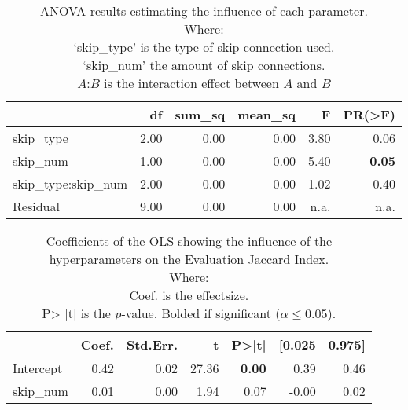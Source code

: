 \begin{table}[ht]
\centering
\caption{ANOVA results estimating the influence of each parameter.\\Where: \\\hphantom{tabb}`skip\_type' is the type of skip connection used.\\\hphantom{tabb}`skip\_num' the amount of skip connections.\\\hphantom{tabb}$A$:$B$ is the interaction effect between $A$ and $B$}
\label{tab:skip_importance_anova_all}
\begin{tabular}{lrrrrr}
\toprule
 & df & sum\_sq & mean\_sq & F & PR(>F) \\
\midrule
skip\_type & 2.00 & 0.00 & 0.00 & 3.80 & 0.06 \\
skip\_num & 1.00 & 0.00 & 0.00 & 5.40 & \textbf{0.05} \\
skip\_type:skip\_num & 2.00 & 0.00 & 0.00 & 1.02 & 0.40 \\
Residual & 9.00 & 0.00 & 0.00 & n.a. & n.a. \\
\bottomrule
\end{tabular}
\end{table}


\begin{table}[ht]
\centering
\caption{Coefficients of the OLS showing the influence of the hyperparameters on the Evaluation Jaccard Index.\\Where:\\\hphantom{tabb}Coef. is the effectsize.\\\hphantom{tabb}P> |t| is the $p$-value. Bolded if significant ($\alpha\le0.05$).}
\label{tab:skip_importance_ols_effects}
\begin{tabular}{lrrrrrr}
\toprule
 & Coef. & Std.Err. & t & P>|t| & [0.025 & 0.975] \\
\midrule
Intercept & 0.42 & 0.02 & 27.36 & \textbf{0.00} & 0.39 & 0.46 \\
skip\_num & 0.01 & 0.00 & 1.94 & 0.07 & -0.00 & 0.02 \\
\bottomrule
\end{tabular}
\end{table}
